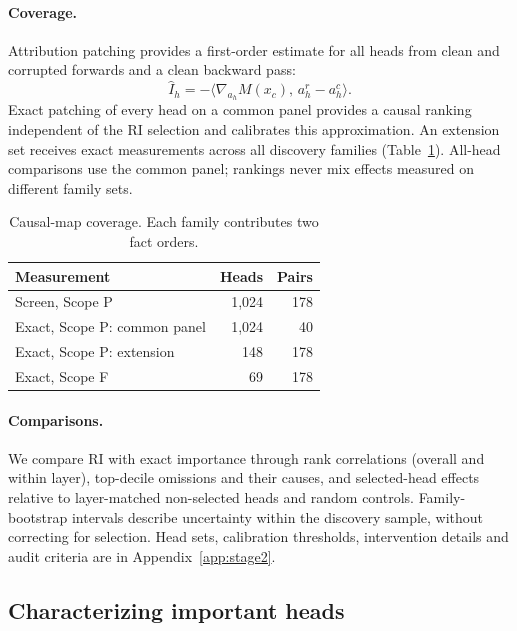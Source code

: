 \paragraph{Coverage.}
Attribution patching \citep{syed2023attribution} provides a first-order estimate
for all heads from clean and corrupted forwards and a clean backward pass:
\begin{equation}
\label{eq:screen}
\widehat I_h=-\big\langle\nabla_{a_h}M(x_c),\,a_h^r-a_h^c\big\rangle .
\end{equation}
Exact patching of every head on a common panel provides a causal ranking
independent of the RI selection and calibrates this approximation. An extension
set receives exact measurements across all discovery families
(Table~\ref{tab:coverage}). All-head comparisons use the common panel; rankings
never mix effects measured on different family sets.

\begin{table}[t]
\centering\small
\begin{tabular}{@{}lrr@{}}
\toprule
Measurement & Heads & Pairs \\
\midrule
Screen, Scope P & 1,024 & 178 \\
Exact, Scope P: common panel & 1,024 & 40 \\
Exact, Scope P: extension & 148 & 178 \\
Exact, Scope F & 69 & 178 \\
\bottomrule
\end{tabular}
\caption{Causal-map coverage. Each family contributes two fact orders.}
\label{tab:coverage}
\end{table}

\paragraph{Comparisons.}
We compare RI with exact importance through rank correlations (overall and within
layer), top-decile omissions and their causes, and selected-head effects relative
to layer-matched non-selected heads and random controls. Family-bootstrap intervals
describe uncertainty within the discovery sample, without correcting for selection.
Head sets, calibration thresholds, intervention details and audit criteria are in
Appendix~\ref{app:stage2}.

\subsection{Characterizing important heads}
\label{sec:method-char}

